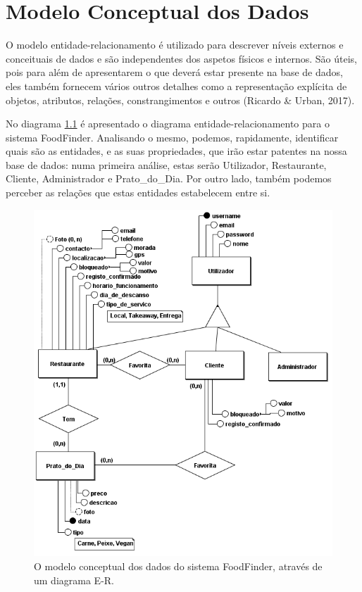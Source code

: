 \documentclass[a4paper,12pt]{report}
\begin{document}
\chapter{Modelo Conceptual dos Dados}

	O modelo entidade-relacionamento é utilizado para descrever níveis externos e conceituais de dados e são independentes dos aspetos físicos e internos. São úteis, pois para além de apresentarem o que deverá estar presente na base de dados, eles também fornecem vários outros detalhes como a representação explícita de objetos, atributos, relações, constrangimentos e outros (Ricardo \& Urban, 2017).
	
	No diagrama \ref{fig:diagramaER} é apresentado o diagrama entidade-relacionamento para o sistema FoodFinder. Analisando o mesmo, podemos, rapidamente, identificar quais são as entidades, e as suas propriedades, que irão estar patentes na nossa base de dados: numa primeira análise, estas serão Utilizador, Restaurante, Cliente, Administrador e Prato\_do\_Dia. Por outro lado, também podemos perceber as relações que estas entidades estabelecem entre si.

	\begin{figure}[H]
	\begin{center}
	\includegraphics[scale=0.85]{diagramaER}	
	\end{center}
	\medskip
	\caption{O modelo conceptual dos dados do sistema FoodFinder, através de um diagrama E-R.}
	\label{fig:diagramaER}	
	\end{figure}
\end{document}
